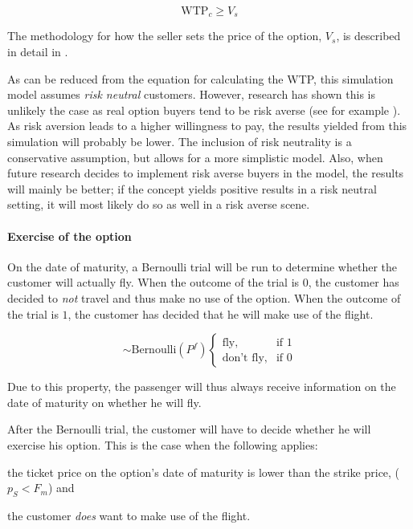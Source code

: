 $$ \mbox{WTP}_c \ge V_s $$

The methodology for how the seller sets the price of the option, $V_s$, is described in detail in .

As can be reduced from the equation for calculating the WTP, this simulation model assumes \emph{risk neutral} customers. However, research has shown this is unlikely the case as real option buyers tend to be risk averse (see for example \cite{miller2004empirical}). As risk aversion leads to a higher willingness to pay, the results yielded from this simulation will probably be lower. The inclusion of risk neutrality is a conservative assumption, but allows for a more simplistic model. Also, when future research decides to implement risk averse buyers in the model, the results will mainly be better; if the concept yields positive results in a risk neutral setting, it will most likely do so as well in a risk averse scene.

\paragraph{Exercise of the option}
On the date of maturity, a Bernoulli trial will be run to determine whether the customer will actually fly. When the outcome of the trial is $0$, the customer has decided to \emph{not} travel and thus make no use of the option. When the outcome of the trial is $1$, the customer has decided that he will make use of the flight.

\begin{equation}
\sim \mbox{Bernoulli}(P^f)\begin{cases}
     \mbox{fly}, & \mbox{if } 1 \\
    \mbox{don't fly}, & \mbox{if } 0 \end{cases}
\end{equation}

Due to this property, the passenger will thus always receive information on the date of maturity on whether he will fly.

After the Bernoulli trial, the customer will have to decide whether he will exercise his option. This is the case when the following applies:
\begin{compactitem}
    \item the ticket price on the option's date of maturity is lower than the strike price, ($p_S < F_m$) and
    \item the customer \emph{does} want to make use of the flight.
\end{compactitem}

